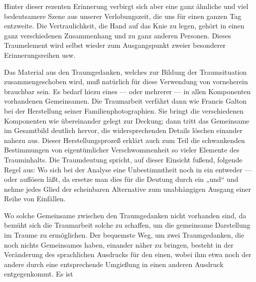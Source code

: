 \documentclass[twoside=true,titlepage=false,open=any, parskip=never, fontsize=10pt, headings=small, chapterprefix=false, appendixprefix=false]{scrbook}
\begin{document}
         
            
            
            
        \pstart
        Hinter dieser rezenten Erinnerung verbirgt sich aber eine ganz
               ähnliche und viel bedeutsamere Szene aus unserer Verlobungszeit, die uns für
               einen ganzen Tag entzweite. Die Vertraulichkeit, die Hand auf das Knie zu legen,
               gehört in einen ganz verschiedenen Zusammenhang und zu ganz anderen Personen.
               Dieses Traumelement wird selbst wieder zum Ausgangspunkt zweier
               besonderer Erinnerungsreihen usw.
        \pend
    
            
        \pstart
        Das Material aus den Traumgedanken, welches zur Bildung der Traumsituation
               zusammengeschoben wird, muß natürlich für diese Verwendung von vorneherein
               brauchbar sein. Es bedarf hiezu eines — oder mehrerer — in allen Komponenten
                  vorhandenen Gemeinsamen. Die
               Traumarbeit verfährt dann wie
               Francis Galton bei der Herstellung seiner
                  Familienphotographien. Sie bringt die verschiedenen Komponenten
               wie übereinander gelegt zur Deckung; dann tritt das Gemeinsame
               im Gesamtbild deutlich hervor, die widersprechenden Details löschen
               einander nahezu aus. Dieser Herstellungsprozeß erklärt auch zum Teil die
               schwankenden Bestimmungen von eigentümlicher Verschwommenheit so
               vieler Elemente des Trauminhalts. Die Traumdeutung spricht, auf
               dieser Einsicht fußend, folgende Regel aus: Wo sich bei der Analyse eine Unbestimmtheit noch in ein entweder — oder
               auflösen läßt, da ersetze man dies für die Deutung durch ein „und“ und nehme jedes Glied der scheinbaren
               Alternative zum unabhängigen Ausgang einer Reihe von Einfällen.
        \pend
    
            
        \pstart
        Wo solche Gemeinsame zwischen den Traumgedanken
               nicht vorhanden sind, da bemüht sich die Traumarbeit solche zu schaffen, um die gemeinsame Darstellung im Traume zu
               ermöglichen. Der bequemste Weg, um zwei Traumgedanken, die noch nichts
               Gemeinsames haben, einander näher zu bringen, besteht in der Veränderung des
               sprachlichen Ausdrucks für den einen, wobei ihm etwa noch der andere durch eine
               entsprechende Umgießung in einen anderen Ausdruck entgegenkommt. Es ist
        \pend
    
\end{document}
